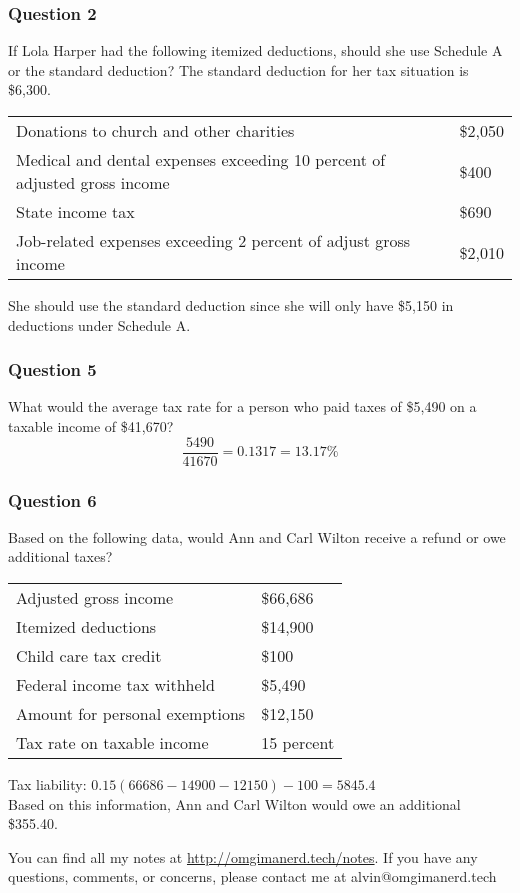 \documentclass{math}
\begin{document}
\subsubsection*{Question 2}
If Lola Harper had the following itemized deductions, should she use Schedule
A or the standard deduction? The standard deduction for her tax situation is
\$6,300.
\begin{center}
  \begin{tabular}{ll}
    Donations to church and other charities & \$2,050 \\
    Medical and dental expenses exceeding 10 percent of adjusted gross income &
      \$400 \\
    State income tax & \$690 \\
    Job-related expenses exceeding 2 percent of adjust gross income & \$2,010 \\
  \end{tabular}
\end{center}
She should use the standard deduction since she will only have \$5,150 in
deductions under Schedule A.

\subsubsection*{Question 5}
What would the average tax rate for a person who paid taxes of \$5,490 on a
taxable income of \$41,670?
\[ \frac{5490}{41670} = 0.1317 = 13.17\% \]

\subsubsection*{Question 6}
Based on the following data, would Ann and Carl Wilton receive a refund or owe
additional taxes?
\begin{center}
  \begin{tabular}{ll}
    Adjusted gross income & \$66,686 \\
    Itemized deductions & \$14,900 \\
    Child care tax credit & \$100 \\
    Federal income tax withheld & \$5,490 \\
    Amount for personal exemptions & \$12,150 \\
    Tax rate on taxable income & 15 percent
  \end{tabular}
\end{center}
Tax liability: \( 0.15(66686 - 14900 - 12150) - 100 = 5845.4 \) \\
Based on this information, Ann and Carl Wilton would owe an additional \$355.40.

\begin{center}
  You can find all my notes at \url{http://omgimanerd.tech/notes}. If you have
  any questions, comments, or concerns, please contact me at
  alvin@omgimanerd.tech
\end{center}
\end{document}
